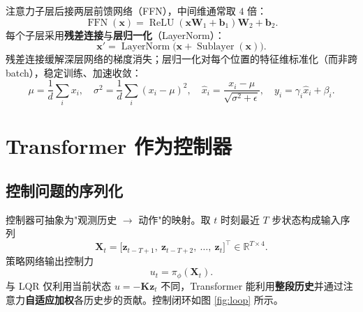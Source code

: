 \documentclass[11pt,a4paper]{article}
\begin{document}
注意力子层后接两层前馈网络（FFN），中间维通常取 $4$ 倍：
\begin{equation}
    \operatorname{FFN}(\mathbf x) = \operatorname{ReLU}(\mathbf x\mathbf W_1 + \mathbf b_1)\mathbf W_2 + \mathbf b_2 .
\end{equation}
每个子层采用\textbf{残差连接}与\textbf{层归一化}（LayerNorm）：
\begin{equation}
    \mathbf x' = \operatorname{LayerNorm}\big(\mathbf x + \operatorname{Sublayer}(\mathbf x)\big) .
\end{equation}
残差连接缓解深层网络的梯度消失；层归一化对每个位置的特征维标准化（而非跨 batch），稳定训练、加速收敛：
\begin{equation}
    \mu = \frac{1}{d}\sum_i x_i,\quad
    \sigma^2 = \frac{1}{d}\sum_i (x_i - \mu)^2,\quad
    \hat x_i = \frac{x_i - \mu}{\sqrt{\sigma^2 + \epsilon}},\quad
    y_i = \gamma_i \hat x_i + \beta_i .
\end{equation}

\section{Transformer 作为控制器}

\subsection{控制问题的序列化}

控制器可抽象为"观测历史 $\to$ 动作"的映射。取 $t$ 时刻最近 $T$ 步状态构成输入序列
\begin{equation}
    \mathbf X_t = \big[\mathbf z_{t-T+1},\ \mathbf z_{t-T+2},\ \dots,\ \mathbf z_t\big]^{\top} \in \mathbb{R}^{T\times 4} .
\end{equation}
策略网络输出控制力
\begin{equation}
    u_t = \pi_\phi(\mathbf X_t) .
\end{equation}
与 LQR 仅利用当前状态 $u = -\mathbf K\mathbf z_t$ 不同，Transformer 能利用\textbf{整段历史}并通过注意力\textbf{自适应加权}各历史步的贡献。控制闭环如图 \ref{fig:loop} 所示。
\end{document}
